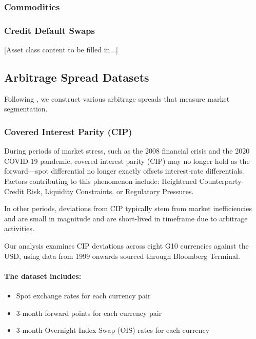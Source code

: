 \documentclass{article}
\begin{document}
\begin{appendices}
\subsubsection{Commodities}
\label{sec:commodities}

\subsubsection{Credit Default Swaps}
\label{sec:cds}

[Asset class content to be filled in...]

\subsection{Arbitrage Spread Datasets}
\label{sec:arbitrage}


Following \cite{Siriwardane2021}, we construct various arbitrage spreads that measure market segmentation.

\subsubsection{Covered Interest Parity (CIP)}
     

During periods of market stress, such as the 2008 financial crisis and the 2020 COVID-19
pandemic, covered interest parity (CIP) may no longer hold as the forward---spot differential 
no longer exactly offsets interest‐rate differentials. Factors contributing to this phenomenon include:
Heightened Counterparty‐Credit Risk, Liquidity Constraints, or Regulatory Pressures.

In other periods, deviations from CIP typically stem from market inefficiencies and are 
small in magnitude and are short-lived in timeframe due to arbitrage activities.

Our analysis examines CIP deviations across eight G10 currencies against the USD, 
using data from 1999 onwards sourced through Bloomberg Terminal.

\paragraph{The dataset includes:}
\begin{itemize}
    \item Spot exchange rates for each currency pair
    \item 3-month forward points for each currency pair
    \item 3-month Overnight Index Swap (OIS) rates for each currency
\end{itemize}


\end{appendices}
\end{document}
